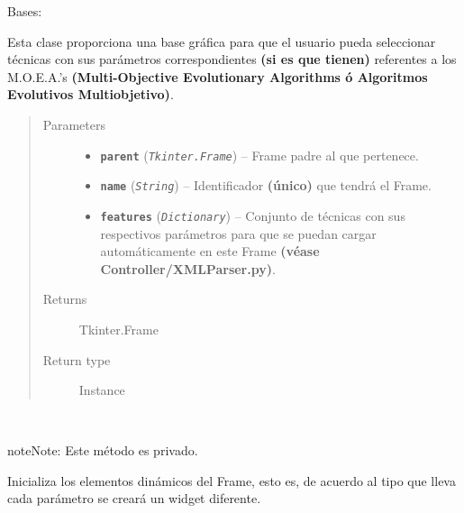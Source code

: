 \documentclass[letterpaper,10pt,english]{sphinxmanual}
\begin{document}
\begin{fulllineitems}
\label{View/Main/MOEA/AlgorithmFrame:View.Main.MOEA.AlgorithmFrame.AlgorithmFrame}
Bases: 

Esta clase proporciona una base gráfica para que el usuario pueda
seleccionar técnicas con sus parámetros correspondientes \textbf{(si es que tienen)}
referentes a los M.O.E.A.'s \textbf{(Multi-Objective Evolutionary Algorithms ó Algoritmos Evolutivos Multiobjetivo)}.
\begin{quote}\begin{description}
\item[{Parameters}] \leavevmode\begin{itemize}
\item {} 
\textbf{\texttt{parent}} (\emph{\texttt{Tkinter.Frame}}) -- Frame padre al que pertenece.

\item {} 
\textbf{\texttt{name}} (\emph{\texttt{String}}) -- Identificador \textbf{(único)} que tendrá el Frame.

\item {} 
\textbf{\texttt{features}} (\emph{\texttt{Dictionary}}) -- Conjunto de técnicas con sus respectivos parámetros para que
se puedan cargar automáticamente en este Frame \textbf{(véase
Controller/XMLParser.py)}.

\end{itemize}

\item[{Returns}] \leavevmode
Tkinter.Frame

\item[{Return type}] \leavevmode
Instance

\end{description}\end{quote}

\begin{fulllineitems}
\label{View/Main/MOEA/AlgorithmFrame:View.Main.MOEA.AlgorithmFrame.AlgorithmFrame._AlgorithmFrame__create_dynamic_widgets}~
\begin{notice}{note}{Note:}
Este método es privado.
\end{notice}

Inicializa los elementos dinámicos del Frame, esto es, de acuerdo al tipo 
que lleva cada parámetro se creará un widget diferente.


\end{fulllineitems}
\end{fulllineitems}
\end{document}
